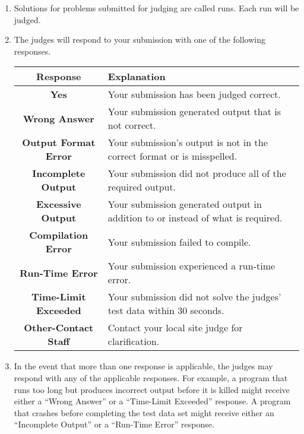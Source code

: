 \begin{enumerate}
\setcounter{enumi}{\value{savedEnumi}}

\item Solutions for problems submitted for judging are called runs.
  Each run will be judged.  
  

\item
  The judges will respond to your submission with one of the following
  responses.

\begin{center}
\begin{tabular}{|c|p{4in}|}
  \hline
{\bfseries Response} & {\bfseries Explanation}\\
\hline
\hline
{\bfseries Yes} & Your submission has been judged correct.\\
{\bfseries Wrong Answer} & Your submission generated output that is
not correct. %
\\
{\bfseries Output Format Error} & Your submission's output is not in
the correct format or is misspelled.\\
{\bfseries Incomplete Output} & Your submission did not produce all of the required output.\\
{\bfseries Excessive Output} & Your submission generated output in
addition to or instead of what is required.\\
{\bfseries Compilation Error} & Your submission failed to compile.\\
{\bfseries Run-Time Error} & Your submission experienced a run-time error.\\
{\bfseries Time-Limit Exceeded} & Your submission did not solve the
judges' test data within 30 seconds.\\
{\bfseries Other-Contact Staff} & Contact your local site judge for clarification.\\
\hline
\end{tabular}
\end{center}


\item In the event that more than one response is applicable,
  the judges may respond with any of the applicable responses.  For
  example, a program that runs too long but produces incorrect
  output before it is killed might receive either a ``Wrong Answer''
  or a ``Time-Limit Exceeded'' response.  A program that crashes before
  completing the test data set might receive either an ``Incomplete
  Output'' or a ``Run-Time Error'' response.





\end{enumerate}
